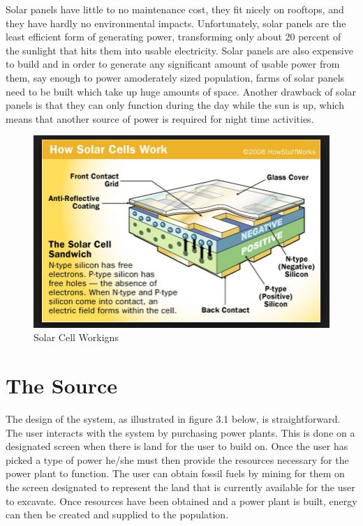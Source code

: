 \documentclass[msc,oneside]{ubcthesis}%
\begin{document}
Solar panels have little to no maintenance cost, they fit nicely on rooftops, and they have hardly no 
environmental impacts. Unfortunately, solar panels are the least efficient form of generating power, transforming  only about 20 percent of the sunlight that hits them into usable electricity. Solar panels are also expensive to build and in order to generate any significant amount of usable power from them, say enough to power amoderately sized population, farms of solar panels need to be built which take up huge amounts of space. Another drawback of solar panels is that they can only function during the day while the sun is up, which means that another source of power is required for night time activities. 
\bigskip

\begin{figure}[hbt]\label{solarCell}
  \begin{center}
    \includegraphics[width=1\textwidth]{solar}
    \caption[Solar Cell Workings]{ Solar Cell Workigns}
  \end{center}
\end{figure}

\newpage

\chapter{The Source}

The design of the system, as illustrated in figure 3.1 below, is straightforward. The user interacts with 
the system by purchasing power plants. This is done on a designated screen when there is land for the user 
to build on. Once the user has picked a type of power he/she must then provide the resources necessary for 
the power plant to function. The user can obtain fossil fuels by mining for them on the screen designated 
to represent the land that is currently available for the user to excavate. Once resources have been 
obtained and a power plant is built, energy can then be created and supplied to the population.
\bigskip
\end{document}
